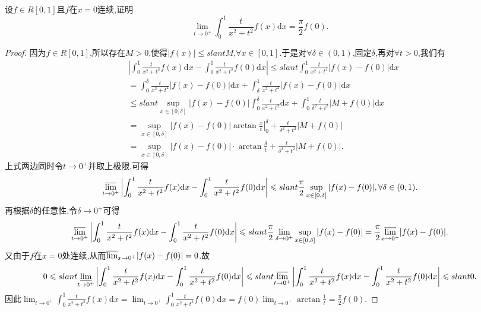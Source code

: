 \documentclass[../../main.tex]{subfiles}
\begin{document}
\begin{example}[$\,\,$Possion核]\label{example:Possion核}
设\(f\in R[0,1]\)且\(f\)在\(x = 0\)连续,证明
\[
\lim_{t\rightarrow 0^+} \int_0^1{\frac{t}{x^2+t^2}f(x)\mathrm{d}x}=\frac{\pi}{2}f(0).
\]
\end{example}
\begin{proof}
因为\(f\in R[0,1]\),所以存在\(M > 0\),使得\(\vert f(x)\vert\leqslant slant M\),\(\forall x\in [0,1]\).于是对\(\forall\delta\in(0,1)\),固定\(\delta\),再对\(\forall t > 0\),我们有
\begin{align*}
&\left|\int_0^1\frac{t}{x^2 + t^2}f(x)\mathrm{d}x - \int_0^1\frac{t}{x^2 + t^2}f(0)\mathrm{d}x\right| \leqslant slant \int_0^1\frac{t}{x^2 + t^2}\vert f(x) - f(0)\vert \mathrm{d}x\\
&= \int_0^{\delta}\frac{t}{x^2 + t^2}\vert f(x) - f(0)\vert \mathrm{d}x + \int_{\delta}^1\frac{t}{x^2 + t^2}\vert f(x) - f(0)\vert \mathrm{d}x\\
&\leqslant slant \sup_{x\in[0,\delta]}\vert f(x) - f(0)\vert\int_0^{\delta}\frac{t}{x^2 + t^2}\mathrm{d}x + \int_0^1\frac{t}{\delta^2 + t^2}\vert M + f(0)\vert \mathrm{d}x\\
&= \sup_{x\in[0,\delta]}\vert f(x) - f(0)\vert\left.\arctan\frac{x}{t}\right|_{0}^{\delta} + \frac{t}{\delta^2 + t^2}\vert M + f(0)\vert\\
&= \sup_{x\in[0,\delta]}\vert f(x) - f(0)\vert\cdot\arctan\frac{\delta}{t} + \frac{t}{\delta^2 + t^2}\vert M + f(0)\vert.
\end{align*}
上式两边同时令\(t\rightarrow 0^+\)并取上极限,可得
\[
{\varlimsup_{t\rightarrow 0^+}}\left|\int_0^1\frac{t}{x^2 + t^2}f(x)\mathrm{d}x - \int_0^1\frac{t}{x^2 + t^2}f(0)\mathrm{d}x\right| \leqslant slant \frac{\pi}{2}\sup_{x\in[0,\delta]}\vert f(x) - f(0)\vert, \forall\delta\in(0,1).
\]
再根据\(\delta\)的任意性,令\(\delta\rightarrow 0^+\)可得
\[
{\varlimsup_{t\rightarrow 0^+}}\left|\int_0^1\frac{t}{x^2 + t^2}f(x)\mathrm{d}x - \int_0^1\frac{t}{x^2 + t^2}f(0)\mathrm{d}x\right| \leqslant slant \frac{\pi}{2}\lim_{\delta\rightarrow 0^+}\sup_{x\in[0,\delta]}\vert f(x) - f(0)\vert = \frac{\pi}{2}{\varlimsup_{x\rightarrow 0^+}}\vert f(x) - f(0)\vert.
\]
又由于\(f\)在\(x = 0\)处连续,从而\({\varlimsup_{x\rightarrow 0^+}}\vert f(x) - f(0)\vert = 0\).故
\[
0\leqslant slant \underset{t\rightarrow 0^+}{{\varliminf }}\left| \int_0^1{\frac{t}{x^2+t^2}f(x)\mathrm{d}x}-\int_0^1{\frac{t}{x^2+t^2}f(0)\mathrm{d}x} \right|\leqslant slant {\varlimsup_{t\rightarrow 0^+} }\left| \int_0^1{\frac{t}{x^2+t^2}f(x)\mathrm{d}x}-\int_0^1{\frac{t}{x^2+t^2}f(0)\mathrm{d}x} \right|\leqslant slant 0.
\]
因此\(\lim_{t\rightarrow 0^+}\int_0^1\frac{t}{x^2 + t^2}f(x)\mathrm{d}x = \lim_{t\rightarrow 0^+}\int_0^1\frac{t}{x^2 + t^2}f(0)\mathrm{d}x = f(0)\lim_{t\rightarrow 0^+}\arctan\frac{1}{t} = \frac{\pi}{2}f(0)\).
\end{proof}
\end{document}
